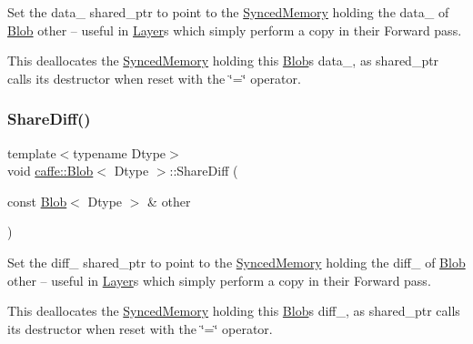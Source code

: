 Set the data\+\_\+ shared\+\_\+ptr to point to the \mbox{\hyperlink{classcaffe_1_1_synced_memory}{Synced\+Memory}} holding the data\+\_\+ of \mbox{\hyperlink{classcaffe_1_1_blob}{Blob}} other -- useful in \mbox{\hyperlink{classcaffe_1_1_layer}{Layer}}s which simply perform a copy in their Forward pass. 

This deallocates the \mbox{\hyperlink{classcaffe_1_1_synced_memory}{Synced\+Memory}} holding this \mbox{\hyperlink{classcaffe_1_1_blob}{Blob}}\textquotesingle{}s data\+\_\+, as shared\+\_\+ptr calls its destructor when reset with the \char`\"{}=\char`\"{} operator. \mbox{\label{classcaffe_1_1_blob_a004781965b09f94c409cec9a6fc7c35c}} 
\subsubsection{\texorpdfstring{Share\+Diff()}{ShareDiff()}\hspace{0.1cm}{\footnotesize\ttfamily [1/2]}}
{\footnotesize\ttfamily template$<$typename Dtype$>$ \\
void \mbox{\hyperlink{classcaffe_1_1_blob}{caffe\+::\+Blob}}$<$ Dtype $>$\+::Share\+Diff (\begin{DoxyParamCaption}\item[{const \mbox{\hyperlink{classcaffe_1_1_blob}{Blob}}$<$ Dtype $>$ \&}]{other }\end{DoxyParamCaption})}



Set the diff\+\_\+ shared\+\_\+ptr to point to the \mbox{\hyperlink{classcaffe_1_1_synced_memory}{Synced\+Memory}} holding the diff\+\_\+ of \mbox{\hyperlink{classcaffe_1_1_blob}{Blob}} other -- useful in \mbox{\hyperlink{classcaffe_1_1_layer}{Layer}}s which simply perform a copy in their Forward pass. 

This deallocates the \mbox{\hyperlink{classcaffe_1_1_synced_memory}{Synced\+Memory}} holding this \mbox{\hyperlink{classcaffe_1_1_blob}{Blob}}\textquotesingle{}s diff\+\_\+, as shared\+\_\+ptr calls its destructor when reset with the \char`\"{}=\char`\"{} operator. \mbox{\label{classcaffe_1_1_blob_a004781965b09f94c409cec9a6fc7c35c}} 
